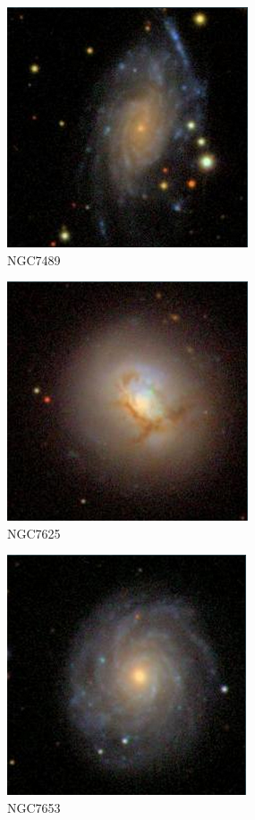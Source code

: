 \documentclass[9pt]{revtex4-1}
\begin{document}
\begin{figure}
\includegraphics[scale=0.3]{NGC7489.png}
\caption{NGC7489}
\end{figure}
\begin{figure}
\includegraphics[scale=0.3]{NGC7625.png}
\caption{NGC7625}
\end{figure}
\begin{figure}
\includegraphics[scale=0.3]{NGC7653.png}
\caption{NGC7653}
\end{figure}
\end{document}
